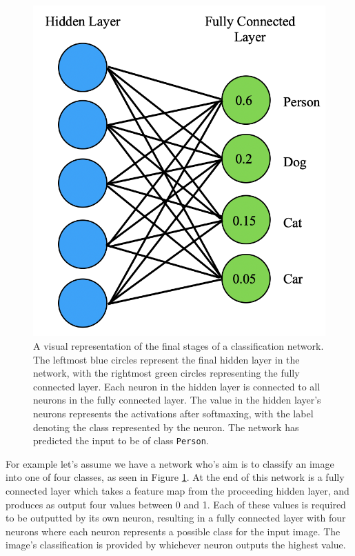 \begin{figure}[!hb]
	\begin{center}
		\includegraphics[scale=0.45]{Chapter2/figs/fully-connected.png}
	\end{center}
	\caption{A visual representation of the final stages of a classification network. The leftmost blue circles represent the final hidden layer in the network, with the rightmost green circles representing the fully connected layer. Each neuron in the hidden layer is connected to all neurons in the fully connected layer. The value in the hidden layer's neurons represents the activations after softmaxing, with the label denoting the class represented by the neuron. The network has predicted the input to be of class \texttt{Person}.}
	\label{fig:fully-connected}
\end{figure}

For example let's assume we have a network who's aim is to classify an image into one of four classes, as seen in Figure \ref{fig:fully-connected}. At the end of this network is a fully connected layer which takes a feature map from the proceeding hidden layer, and produces as output four values between 0 and 1. Each of these values is required to be outputted by its own neuron, resulting in a fully connected layer with four neurons where each neuron represents a possible class for the input image. The image's classification is provided by whichever neuron outputs the highest value. 


